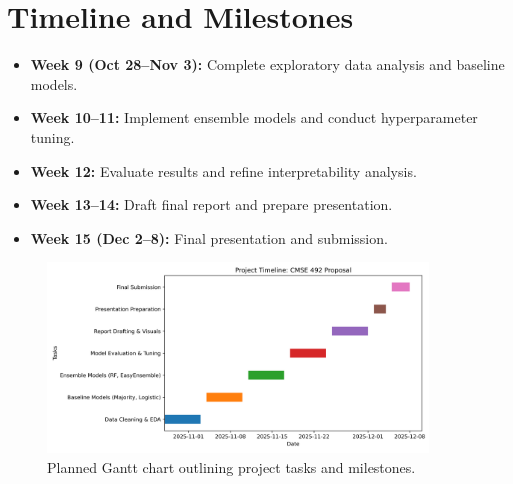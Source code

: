 \documentclass[11pt]{article}
\begin{document}
\section{Timeline and Milestones}
\begin{itemize}
    \item \textbf{Week 9 (Oct 28–Nov 3):} Complete exploratory data analysis and baseline models.
    \item \textbf{Week 10–11:} Implement ensemble models and conduct hyperparameter tuning.
    \item \textbf{Week 12:} Evaluate results and refine interpretability analysis.
    \item \textbf{Week 13–14:} Draft final report and prepare presentation.
    \item \textbf{Week 15 (Dec 2–8):} Final presentation and submission.
\end{itemize}

\begin{figure}[h]
    \centering
    \includegraphics[width=0.9\textwidth]{../figures/gantt_chart.png}
    \caption{Planned Gantt chart outlining project tasks and milestones.}
\end{figure}
\end{document}
